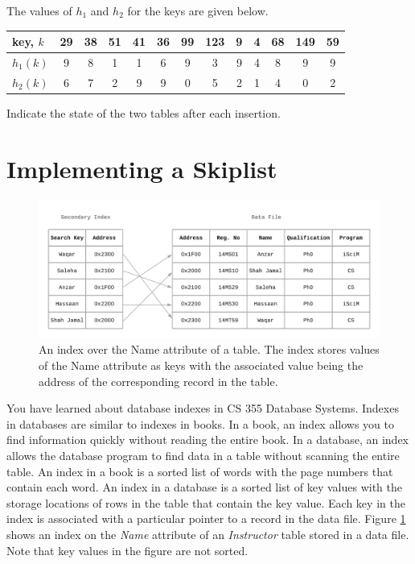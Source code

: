 \documentclass[addpoints]{exam}
\begin{document}
\begin{questions}
\begin{parts}
    The values of $h_1$ and $h_2$ for the keys are given below.
    \begin{center}
      \begin{tabular}{|l||*{12}{c|}}
        \hline
        key, $k$ & 29 & 38 & 51 & 41 & 36 & 99 & 123 &  9 &  4 & 68 & 149 & 59\\\hline\hline
        $h_1(k)$  & 9 & 8 & 1 & 1 & 6 & 9 & 3 &  9 &  4 & 8 & 9 & 9\\\hline
        $h_2(k)$  & 6 & 7 & 2 & 9 & 9 & 0 & 5 &  2 &  1 & 4 & 0 & 2\\\hline
      \end{tabular}
    \end{center}
    
    Indicate the state of the two tables after each insertion.
  \end{parts}
\end{questions}

\newpage
\part{Implementing a Skiplist}

\begin{figure}[!h]
  \centering
  \includegraphics[width=.8\linewidth]{index}
  \caption{An index over the Name attribute of a table. The index stores values of the Name attribute as keys with the associated value being the address of the corresponding record in the table.}
  \label{fig:index}
\end{figure}

You have learned about database indexes in CS 355 Database Systems. Indexes in databases are similar to indexes in books. In a book, an index allows you to find information quickly without reading the entire book. In a database, an index allows the database program to find data in a table without scanning the entire table. An index in a book is a sorted list of words with the page numbers that contain each word. An index in a database is a sorted list of key values with the storage locations of rows in the table that contain the key value. Each key in the index is associated with a particular pointer to a record in the data file. Figure \ref{fig:index} shows an index on the \textit{Name} attribute of an \textit{Instructor} table stored in a data file. Note that key values in the figure are not sorted.
 
\end{document}
